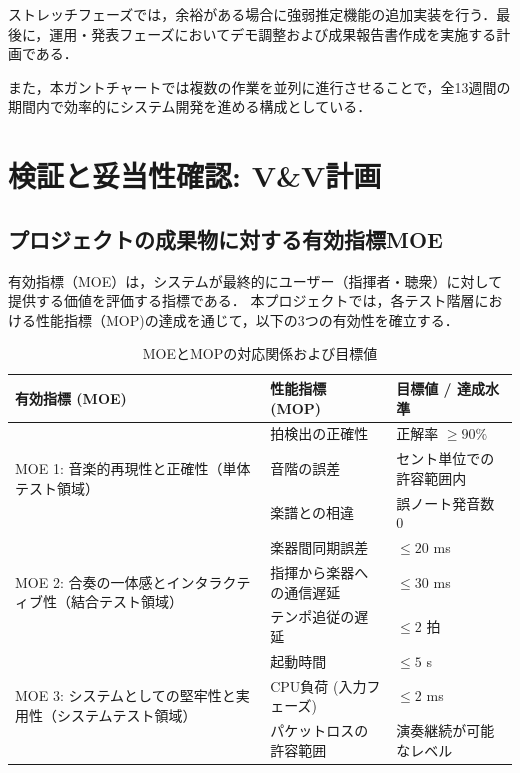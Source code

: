 \documentclass[lualatex,book,paper=a4paper,jafontsize=11.5pt,jafontscale=1.05]{jlreq}
\begin{document}
ストレッチフェーズでは，余裕がある場合に強弱推定機能の追加実装を行う．最後に，運用・発表フェーズにおいてデモ調整および成果報告書作成を実施する計画である．

また，本ガントチャートでは複数の作業を並列に進行させることで，全13週間の期間内で効率的にシステム開発を進める構成としている．


\section{検証と妥当性確認: V\&V計画}
\subsection{プロジェクトの成果物に対する有効指標MOE}
有効指標（MOE）は，システムが最終的にユーザー（指揮者・聴衆）に対して提供する価値を評価する指標である．
本プロジェクトでは，各テスト階層における性能指標（MOP)の達成を通じて，以下の3つの有効性を確立する．
\begin{table}[H]
  \centering
  \caption{MOEとMOPの対応関係および目標値}
  \begin{tabular}{|l|l|l|}
    \hline
    \textbf{有効指標 (MOE)} & \textbf{性能指標 (MOP)} & \textbf{目標値 / 達成水準} \\ \hline
    \multirow{3}{10em}{MOE 1: 音楽的再現性と正確性（単体テスト領域）} & 拍検出の正確性 & 正解率 $\ge 90\%$ \\ \cline{2-3}
    & 音階の誤差 & セント単位での許容範囲内 \\ \cline{2-3}
    & 楽譜との相違 & 誤ノート発音数 0 \\ \hline
    \multirow{3}{10em}{MOE 2: 合奏の一体感とインタラクティブ性（結合テスト領域）} & 楽器間同期誤差 & $\le 20$ ms \\ \cline{2-3}
    & 指揮から楽器への通信遅延 & $\le 30$ ms \\ \cline{2-3}
    & テンポ追従の遅延 & $\le 2$ 拍 \\ \hline
    \multirow{3}{10em}{MOE 3: システムとしての堅牢性と実用性（システムテスト領域）} & 起動時間 & $\le 5$ s \\ \cline{2-3}
    & CPU負荷 (入力フェーズ) & $\le 2$ ms \\ \cline{2-3}
    & パケットロスの許容範囲 & 演奏継続が可能なレベル \\ \hline
  \end{tabular}
\end{table}

\end{document}
